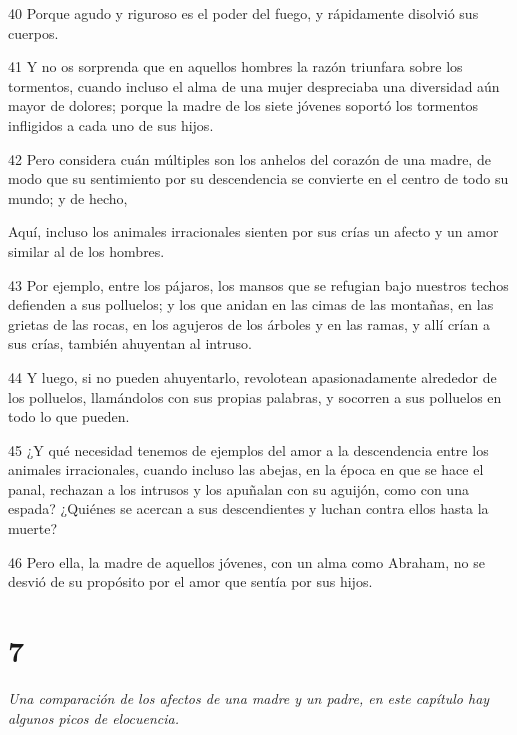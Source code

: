 \par 40 Porque agudo y riguroso es el poder del fuego, y rápidamente disolvió sus cuerpos.

\par 41 Y no os sorprenda que en aquellos hombres la razón triunfara sobre los tormentos, cuando incluso el alma de una mujer despreciaba una diversidad aún mayor de dolores; porque la madre de los siete jóvenes soportó los tormentos infligidos a cada uno de sus hijos.

\par 42 Pero considera cuán múltiples son los anhelos del corazón de una madre, de modo que su sentimiento por su descendencia se convierte en el centro de todo su mundo; y de hecho,

Aquí, incluso los animales irracionales sienten por sus crías un afecto y un amor similar al de los hombres.

\par 43 Por ejemplo, entre los pájaros, los mansos que se refugian bajo nuestros techos defienden a sus polluelos; y los que anidan en las cimas de las montañas, en las grietas de las rocas, en los agujeros de los árboles y en las ramas, y allí crían a sus crías, también ahuyentan al intruso.

\par 44 Y luego, si no pueden ahuyentarlo, revolotean apasionadamente alrededor de los polluelos, llamándolos con sus propias palabras, y socorren a sus polluelos en todo lo que pueden.

\par 45 ¿Y qué necesidad tenemos de ejemplos del amor a la descendencia entre los animales irracionales, cuando incluso las abejas, en la época en que se hace el panal, rechazan a los intrusos y los apuñalan con su aguijón, como con una espada? ¿Quiénes se acercan a sus descendientes y luchan contra ellos hasta la muerte?

\par 46 Pero ella, la madre de aquellos jóvenes, con un alma como Abraham, no se desvió de su propósito por el amor que sentía por sus hijos.

\chapter{7}

\par \textit{Una comparación de los afectos de una madre y un padre, en este capítulo hay algunos picos de elocuencia.}

